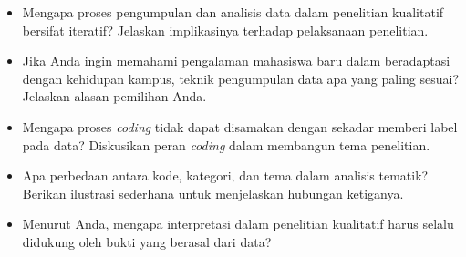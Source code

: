 \documentclass[
  indonesian,
  letterpaper,
  DIV=11,
  numbers=noendperiod]{scrreprt}
\providecommand{\tightlist}{%
  \setlength{\itemsep}{0pt}\setlength{\parskip}{0pt}}
\begin{document}
\begin{tcolorbox}[enhanced jigsaw, colframe=quarto-callout-important-color-frame, toptitle=1mm, breakable, leftrule=.75mm, arc=.35mm, toprule=.15mm, colback=white, colbacktitle=quarto-callout-important-color!10!white, bottomtitle=1mm, bottomrule=.15mm, titlerule=0mm, title=\textcolor{quarto-callout-important-color}{\faExclamation}\hspace{0.5em}{Refleksi \& Diskusi}, coltitle=black, left=2mm, opacitybacktitle=0.6, opacityback=0, rightrule=.15mm]

\begin{itemize}
\tightlist
\item
  Mengapa proses pengumpulan dan analisis data dalam penelitian
  kualitatif bersifat iteratif? Jelaskan implikasinya terhadap
  pelaksanaan penelitian.
\item
  Jika Anda ingin memahami pengalaman mahasiswa baru dalam beradaptasi
  dengan kehidupan kampus, teknik pengumpulan data apa yang paling
  sesuai? Jelaskan alasan pemilihan Anda.
\item
  Mengapa proses \emph{coding} tidak dapat disamakan dengan sekadar
  memberi label pada data? Diskusikan peran \emph{coding} dalam
  membangun tema penelitian.
\item
  Apa perbedaan antara kode, kategori, dan tema dalam analisis tematik?
  Berikan ilustrasi sederhana untuk menjelaskan hubungan ketiganya.
\item
  Menurut Anda, mengapa interpretasi dalam penelitian kualitatif harus
  selalu didukung oleh bukti yang berasal dari data?
\end{itemize}

\end{tcolorbox}
\end{document}
